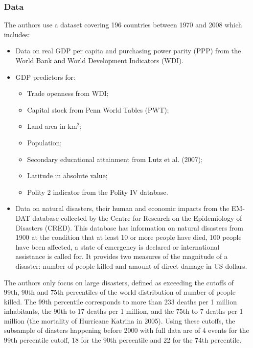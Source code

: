 \documentclass[12pt,a4paper,draft]{article}
\begin{document}
\subsubsection*{Data}
The authors use a dataset covering 196 countries between 1970 and 2008 which includes:
\begin{itemize}
    \item Data on real GDP per capita and purchasing power parity (PPP) from the World 
    Bank and World Development Indicators (WDI).
    \item GDP predictors for:
    \begin{itemize}
        \item Trade openness from WDI;
        \item Capital stock from Penn World Tables (PWT);
        \item Land area in km$^2$;
        \item Population;
        \item Secondary educational attainment from Lutz et al. (2007);
        \item Latitude in absolute value;
        \item Polity 2 indicator from the Polity IV database.
    \end{itemize}
    \item Data on natural disasters, their human and economic impacts from the EM-DAT 
    database collected by the Centre for Research on the Epidemiology of Disasters (CRED). 
    This database has information on natural disasters from 1900 at the condition that 
    at least 10 or more people have died, 100 people have been affected, a state of 
    emergency is declared or international assistance is called for. It provides two measures 
    of the magnitude of a disaster: number of people killed and amount of direct damage in 
    US dollars.
     
\end{itemize}

The authors only focus on large disasters, defined as exceeding the cutoffs of 99th, 90th 
and 75th percentiles of the world distribution of number of people killed. The 99th percentile 
corresponds to more than 233 deaths per 1 million inhabitants, the 90th to 17 deaths per 1 
million, and the 75th to 7 deaths per 1 million (the mortality of Hurricane Katrina in 2005).
Using these cutoffs, the subsample of diasters happening before 2000 with full data are of 4 
events for the 99th percentile cutoff, 18 for the 90th percentile and 22 for the 74th percentile.
\end{document}
